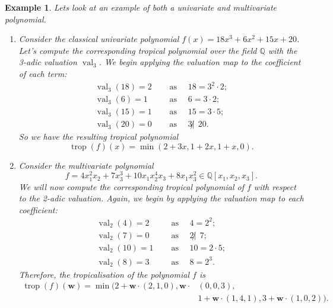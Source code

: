 \documentclass[11pt,reqno,a4paper]{article}
\theoremstyle{theoremstyle}
\theoremstyle{examplestyle}
\newtheorem{example}[theorem]{Example}
\theoremstyle{algorithmstyle}
\numberwithin{equation}{subsection}
\newcommand{\QQ}{\mathbb{Q}}
\DeclareMathOperator{\trop}{trop}
\DeclareMathOperator{\val}{val}
\begin{document}
\begin{example}
    Lets look at an example of both a univariate and multivariate polynomial.
    \begin{enumerate}
        \item[(1)] Consider the classical univariate polynomial $f(x) = 18x^3 + 6x^2 + 15x + 20$. Let's compute the corresponding tropical polynomial over the field $\QQ$ with the 3-adic valuation $\val_3$. We begin applying the valuation map to the coefficient of each term:
        \begin{align*}
            \val_3(18) = 2 \quad &\text{ as } \quad 18 = 3^2\cdot2; \\
            \val_3(6) = 1 \quad &\text{ as } \quad 6 = 3\cdot2; \\
            \val_3(15) = 1 \quad &\text{ as } \quad 15 = 3\cdot5; \\
            \val_3(20) = 0 \quad &\text{ as } \quad 3 \not | \ \ 20. 
        \end{align*}
        So we have the resulting tropical polynomial \[\trop(f)(x) = \min(2+3x,1+2x, 1+x, 0).\]

        \item[(2)] Consider the multivariate polynomial \[f = 4x_1^2x_2 + 7x_3^3 + 10x_1x_2^4x_3 + 8x_1x_3^2 \in \QQ[x_1,x_2,x_3].\] We will now compute the corresponding tropical polynomial of $f$ with respect to the 2-adic valuation. Again, we begin by applying the valuation map to each coefficient:
        \begin{align*}
            \val_2(4) = 2 \quad &\text{ as } \quad 4 = 2^2; \\
            \val_2(7) = 0 \quad &\text{ as } \quad 2 \not | \ \ 7; \\
            \val_2(10) = 1 \quad &\text{ as } \quad 10 = 2\cdot5; \\
            \val_2(8) = 3 \quad &\text{ as } \quad 8 = 2^3. 
        \end{align*}
        Therefore, the tropicalisation of the polynomial $f$ is 
        \begin{align*}
            \trop(f)(\mathbf{w}) = \min( 2+\mathbf{w}\cdot(2,1,0), \mathbf{w}\cdot&(0,0,3),\\
            &1 + \mathbf{w} \cdot (1,4,1), 3+\mathbf{w} \cdot (1,0,2)).
        \end{align*}
    
    \end{enumerate}
    
\end{example}
\end{document}
